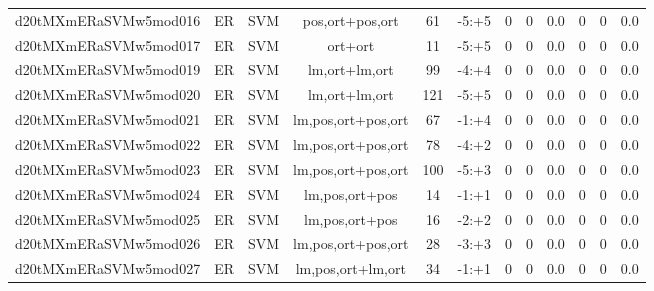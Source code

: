 \documentclass[a4paper]{article}
\begin{document}
\begin{landscape}
\begin{center}
\begin{tabular}{ |c|c|c|c|c|c|c|c|c|c|c|c|}
 
 	
 	\small{ d20tMXmERaSVMw5mod016 } & ER & SVM & pos,ort+pos,ort  &  61 &  -5:+5  &  0 & 0 & 0.0  &  0 & 0 & 0.0 \\
 	

 
 	
 	\small{ d20tMXmERaSVMw5mod017 } & ER & SVM & ort+ort  &  11 &  -5:+5  &  0 & 0 & 0.0  &  0 & 0 & 0.0 \\
 	

 
 	
 	\small{ d20tMXmERaSVMw5mod019 } & ER & SVM & lm,ort+lm,ort  &  99 &  -4:+4  &  0 & 0 & 0.0  &  0 & 0 & 0.0 \\
 	

 
 	
 	\small{ d20tMXmERaSVMw5mod020 } & ER & SVM & lm,ort+lm,ort  &  121 &  -5:+5  &  0 & 0 & 0.0  &  0 & 0 & 0.0 \\
 	

 
 	
 	\small{ d20tMXmERaSVMw5mod021 } & ER & SVM & lm,pos,ort+pos,ort  &  67 &  -1:+4  &  0 & 0 & 0.0  &  0 & 0 & 0.0 \\
 	

 
 	
 	\small{ d20tMXmERaSVMw5mod022 } & ER & SVM & lm,pos,ort+pos,ort  &  78 &  -4:+2  &  0 & 0 & 0.0  &  0 & 0 & 0.0 \\
 	

 
 	
 	\small{ d20tMXmERaSVMw5mod023 } & ER & SVM & lm,pos,ort+pos,ort  &  100 &  -5:+3  &  0 & 0 & 0.0  &  0 & 0 & 0.0 \\
 	

 
 	
 	\small{ d20tMXmERaSVMw5mod024 } & ER & SVM & lm,pos,ort+pos  &  14 &  -1:+1  &  0 & 0 & 0.0  &  0 & 0 & 0.0 \\
 	

 
 	
 	\small{ d20tMXmERaSVMw5mod025 } & ER & SVM & lm,pos,ort+pos  &  16 &  -2:+2  &  0 & 0 & 0.0  &  0 & 0 & 0.0 \\
 	

 
 	
 	\small{ d20tMXmERaSVMw5mod026 } & ER & SVM & lm,pos,ort+pos,ort  &  28 &  -3:+3  &  0 & 0 & 0.0  &  0 & 0 & 0.0 \\
 	

 
 	
 	\small{ d20tMXmERaSVMw5mod027 } & ER & SVM & lm,pos,ort+lm,ort  &  34 &  -1:+1  &  0 & 0 & 0.0  &  0 & 0 & 0.0 \\
 	


\end{tabular}
\end{center}
\end{landscape}
\end{document}
